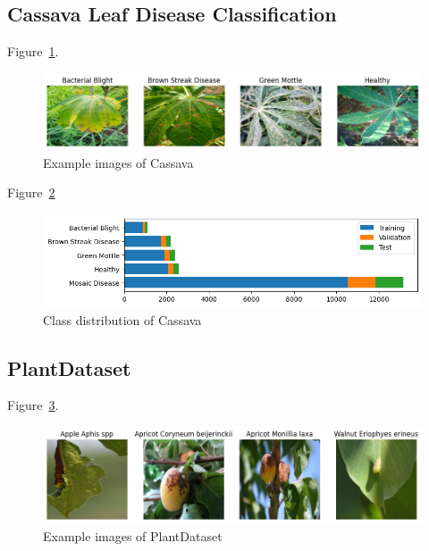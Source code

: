 \subsection{Cassava Leaf Disease Classification}
Figure~\ref{fig:example_images_of_cassava}.

\begin{figure}[H]
    \begin{center}
    \includegraphics[width=15cm]{../images/example_images_of_cassava.png}
    \caption{Example images of Cassava}
   \label{fig:example_images_of_cassava}
    \end{center}
\end{figure}

Figure~\ref{fig:class_distribution_of_cassava}

\begin{figure}[H]
    \begin{center}
    \includegraphics[width=15cm]{../images/class_distribution_of_cassava.png}
    \caption{Class distribution of Cassava}
   \label{fig:class_distribution_of_cassava}
    \end{center}
\end{figure}


\subsection{PlantDataset}

Figure~\ref{fig:example_images_of_plantdataset}.

\begin{figure}[H]
    \begin{center}
    \includegraphics[width=15cm]{../images/example_images_of_plantdataset.png}
    \caption{Example images of PlantDataset}
   \label{fig:example_images_of_plantdataset}
    \end{center}
\end{figure}


